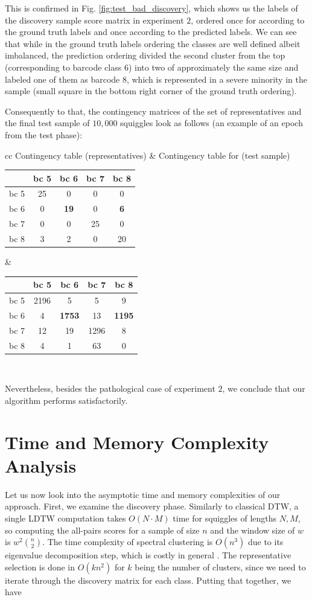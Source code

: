 This is confirmed in Fig. \ref{fig:test_bad_discovery}, which shows us the labels of the discovery sample score matrix in experiment $2$, ordered once for according to the ground truth labels and once according to the predicted labels. We can see that while in the ground truth labels ordering the classes are well defined albeit imbalanced, the prediction ordering divided the second cluster from the top (corresponding to barcode class $6$) into two of approximately the same size and labeled one of them as barcode $8$, which is represented in a severe minority in the sample (small square in the bottom right corner of the ground truth ordering).

Consequently to that, the contingency matrices of the set of representatives and the final test sample of $10,000$ squiggles look as follows (an example of an epoch from the test phase):
\bigskip

\begin{tabular}{ cc }%
\label{tab:bad_test_contingencies}
Contingency table (representatives) & Contingency table for (test sample) \\  
\begin{tabular}{c|c|c|c|c}
& bc 5 & bc 6 & bc 7 & bc 8\\
\hline
bc 5 & 25 & 0 & 0 & 0\\
bc 6 & 0 & \textbf{19} & 0 & \textbf{6}\\
bc 7 & 0 & 0 & 25 & 0\\
bc 8 & 3 & 2 & 0 & 20
\end{tabular} &
\begin{tabular}{c|c|c|c|c}
& bc 5 & bc 6 & bc 7 & bc 8\\
\hline
bc 5 & 2196 & 5 & 5 & 9\\
bc 6 & 4 & \textbf{1753} & 13 & \textbf{1195}\\
bc 7 & 12 & 19 & 1296 & 8\\
bc 8 & 4 & 1 & 63 & 0 
\end{tabular}\\
\end{tabular}
\bigskip

Nevertheless, besides the pathological case of experiment $2$, we conclude that our algorithm performs satisfactorily.

\section{Time and Memory Complexity Analysis}
Let us now look into the asymptotic time and memory complexities of our approach. First, we examine the discovery phase. Similarly to classical DTW, a single LDTW computation takes $O(N \cdot M)$ time for squiggles of lengths $N,M$, so computing the all-pairs scores for a sample of size $n$ and the window size of $w$ is $w^2 \binom{n}{2}$. The time complexity of spectral clustering is $O(n^3)$ due to its eigenvalue decomposition step, which is costly in general \cite{shi2000normalized}. The representative selection is done in $O(kn^2)$ for $k$ being the number of clusters, since we need to iterate through the discovery matrix for each class. Putting that together, we have

